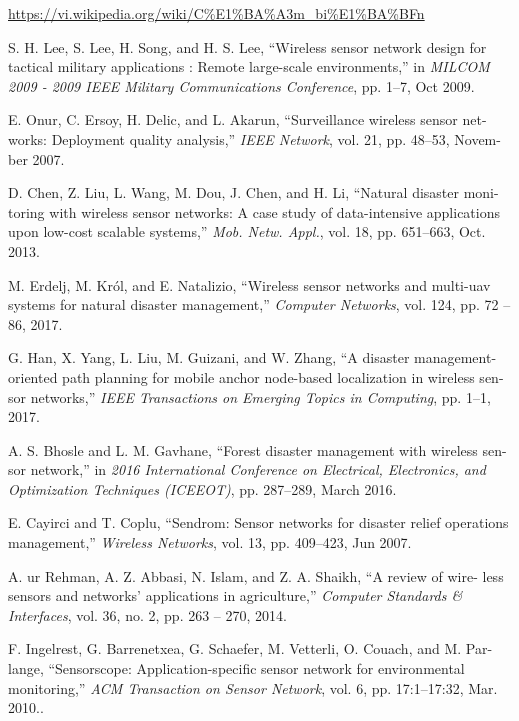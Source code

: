 \documentclass[12pt]{report}
\begin{document}
\begin{thebibliography}{100}
\url{https://vi.wikipedia.org/wiki/C%E1%BA%A3m_bi%E1%BA%BFn}

S. H. Lee, S. Lee, H. Song, and H. S. Lee, “Wireless sensor network design for
tactical military applications : Remote large-scale environments,” in \textit{MILCOM
2009 - 2009 IEEE Military Communications Conference}, pp. 1–7, Oct 2009.

E. Onur, C. Ersoy, H. Delic, and L. Akarun, “Surveillance wireless sensor net-
works: Deployment quality analysis,” \textit{IEEE Network}, vol. 21, pp. 48–53, Novem-
ber 2007.

D. Chen, Z. Liu, L. Wang, M. Dou, J. Chen, and H. Li, “Natural disaster moni-
toring with wireless sensor networks: A case study of data-intensive applications
upon low-cost scalable systems,” \textit{Mob. Netw. Appl.}, vol. 18, pp. 651–663, Oct.
2013.

M. Erdelj, M. Król, and E. Natalizio, “Wireless sensor networks and multi-uav
systems for natural disaster management,” \textit{Computer Networks}, vol. 124, pp. 72
– 86, 2017.

G. Han, X. Yang, L. Liu, M. Guizani, and W. Zhang, “A disaster management-
oriented path planning for mobile anchor node-based localization in wireless sen-
sor networks,” \textit{IEEE Transactions on Emerging Topics in Computing}, pp. 1–1,
2017.

A. S. Bhosle and L. M. Gavhane, “Forest disaster management with wireless sen-
sor network,” in \textit{2016 International Conference on Electrical, Electronics, and
Optimization Techniques (ICEEOT)}, pp. 287–289, March 2016.

E. Cayirci and T. Coplu, “Sendrom: Sensor networks for disaster relief operations
management,” \textit{Wireless Networks}, vol. 13, pp. 409–423, Jun 2007.

A. ur Rehman, A. Z. Abbasi, N. Islam, and Z. A. Shaikh, “A review of wire-
less sensors and networks’ applications in agriculture,” \textit{Computer Standards \&
Interfaces}, vol. 36, no. 2, pp. 263 – 270, 2014.

F. Ingelrest, G. Barrenetxea, G. Schaefer, M. Vetterli, O. Couach, and M. Par-
lange, “Sensorscope: Application-specific sensor network for environmental
monitoring,” \textit{ACM Transaction on Sensor Network}, vol. 6, pp. 17:1–17:32, Mar.
2010..


\end{thebibliography}
\end{document}
